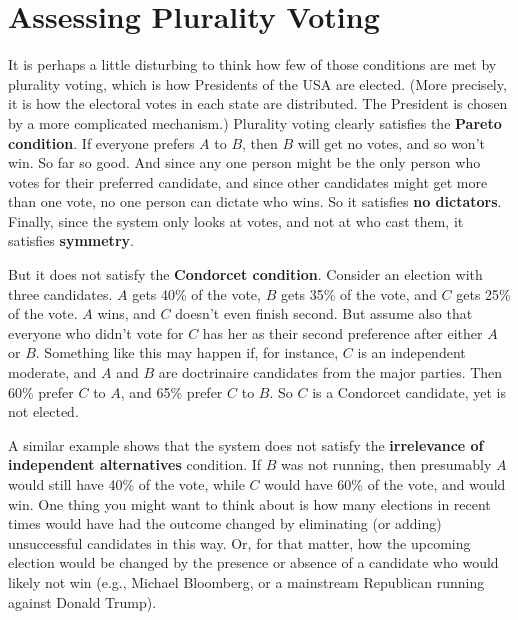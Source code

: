 \section{Assessing Plurality Voting}
It is perhaps a little disturbing to think how few of those conditions are met by plurality voting, which is how Presidents of the USA are elected. (More precisely, it is how the electoral votes in each state are distributed. The President is chosen by a more complicated mechanism.) Plurality voting clearly satisfies the \textbf{Pareto condition}. If everyone prefers $A$ to $B$, then $B$ will get no votes, and so won't win. So far so good. And since any one person might be the only person who votes for their preferred candidate, and since other candidates might get more than one vote, no one person can dictate who wins. So it satisfies \textbf{no dictators}. Finally, since the system only looks at votes, and not at who cast them, it satisfies \textbf{symmetry}.

But it does not satisfy the \textbf{Condorcet condition}. Consider an election with three candidates. $A$ gets 40\% of the vote, $B$ gets 35\% of the vote, and $C$ gets 25\% of the vote. $A$ wins, and $C$ doesn't even finish second. But assume also that everyone who didn't vote for $C$ has her as their second preference after either $A$ or $B$. Something like this may happen if, for instance, $C$ is an independent moderate, and $A$ and $B$ are doctrinaire candidates from the major parties. Then 60\% prefer $C$ to $A$, and 65\% prefer $C$ to $B$. So $C$ is a Condorcet candidate, yet is not elected.

A similar example shows that the system does not satisfy the \textbf{irrelevance of independent alternatives} condition. If $B$ was not running, then presumably $A$ would still have 40\% of the vote, while $C$ would have 60\% of the vote, and would win. One thing you might want to think about is how many elections in recent times would have had the outcome changed by eliminating (or adding) unsuccessful candidates in this way. Or, for that matter, how the upcoming election would be changed by the presence or absence of a candidate who would likely not win (e.g., Michael Bloomberg, or a mainstream Republican running against Donald Trump).

